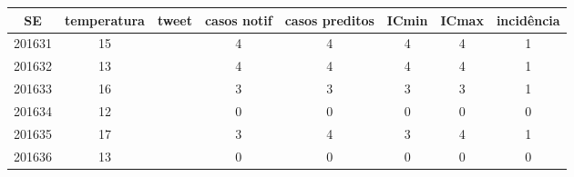 \begin{tabular}{c|ccccccc}
  \hline
SE & temperatura & tweet & casos notif & casos preditos & ICmin & ICmax & incidência \\ 
  \hline
201631 & 15 &  & 4 & 4 & 4 & 4 & 1 \\ 
  201632 & 13 &  & 4 & 4 & 4 & 4 & 1 \\ 
  201633 & 16 &  & 3 & 3 & 3 & 3 & 1 \\ 
  201634 & 12 &  & 0 & 0 & 0 & 0 & 0 \\ 
  201635 & 17 &  & 3 & 4 & 3 & 4 & 1 \\ 
  201636 & 13 &  & 0 & 0 & 0 & 0 & 0 \\ 
   \hline
\end{tabular}
